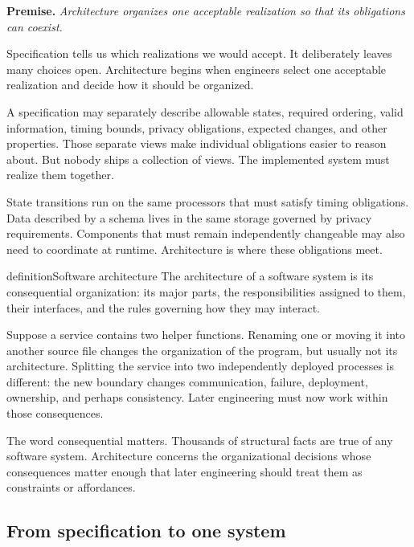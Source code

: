 \textbf{Premise.} \emph{Architecture organizes one acceptable realization so that its obligations can
coexist.}

Specification tells us which realizations we would accept. It deliberately leaves many choices
open. Architecture begins when engineers select one acceptable realization and decide how it should
be organized.

A specification may separately describe allowable states, required ordering, valid information,
timing bounds, privacy obligations, expected changes, and other properties. Those separate views
make individual obligations easier to reason about. But nobody ships a collection of views. The
implemented system must realize them together.

State transitions run on the same processors that must satisfy timing obligations. Data described
by a schema lives in the same storage governed by privacy requirements. Components that must remain
independently changeable may also need to coordinate at runtime. Architecture is where these
obligations meet.

\begin{bookbox}{definition}{Software architecture} %
The architecture of a software system is its consequential organization: its major parts, the
responsibilities assigned to them, their interfaces, and the rules governing how they may interact.

Suppose a service contains two helper functions. Renaming one or moving it into another source
file changes the organization of the program, but usually not its architecture. Splitting the
service into two independently deployed processes is different: the new boundary changes
communication, failure, deployment, ownership, and perhaps consistency. Later engineering must now
work within those consequences.
\end{bookbox}

The word consequential matters. Thousands of structural facts are true of any software system.
Architecture concerns the organizational decisions whose consequences matter enough that later
engineering should treat them as constraints or affordances.

\subsection{From specification to one system}\label{sec-spec-to-system}

